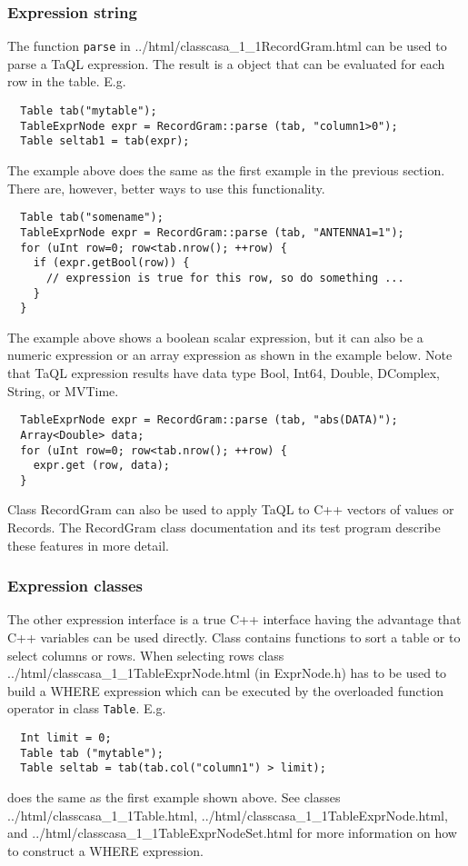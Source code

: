 \subsubsection{Expression string}
    The function \texttt{parse} in
    {../html/classcasa_1_1RecordGram.html}
    can be used to parse a TaQL expression. The result is a
    object that can be evaluated for each row in the table. E.g.
\begin{verbatim}
  Table tab("mytable");
  TableExprNode expr = RecordGram::parse (tab, "column1>0");
  Table seltab1 = tab(expr);
\end{verbatim}
    The example above does the same as the first example in the previous
    section. There are, however, better ways to use this functionality.
\begin{verbatim}
  Table tab("somename");
  TableExprNode expr = RecordGram::parse (tab, "ANTENNA1=1");
  for (uInt row=0; row<tab.nrow(); ++row) {
    if (expr.getBool(row)) {
      // expression is true for this row, so do something ...
    }
  }
\end{verbatim}
    The example above shows a boolean scalar expression, but it can also be
    a numeric expression or an array expression as shown in the example
    below.
    Note that TaQL expression results have data type Bool, Int64, Double,
    DComplex, String, or MVTime.
\begin{verbatim}
  TableExprNode expr = RecordGram::parse (tab, "abs(DATA)");
  Array<Double> data;
  for (uInt row=0; row<tab.nrow(); ++row) {
    expr.get (row, data);
  }
\end{verbatim}

    Class RecordGram can also be used to apply TaQL to C++ vectors of
    values or Records. The RecordGram class documentation and its test
    program describe these features in more detail.

\subsubsection{Expression classes}
    The other expression interface is a true C++ interface having the
    advantage that C++ variables can be used directly. Class
    contains functions to sort a table or to select columns or rows.
    When selecting rows class 
    {../html/classcasa_1_1TableExprNode.html} (in ExprNode.h)
    has to be used to
    build a WHERE expression which can be executed by the overloaded
    function operator in class \texttt{Table}. E.g.
\begin{verbatim}
  Int limit = 0;
  Table tab ("mytable");
  Table seltab = tab(tab.col("column1") > limit);
\end{verbatim}
    does the same as the first example shown above.
    See classes 
    {../html/classcasa_1_1Table.html},
    {../html/classcasa_1_1TableExprNode.html}, and
    {../html/classcasa_1_1TableExprNodeSet.html} for more
    information on how to construct a WHERE expression.

